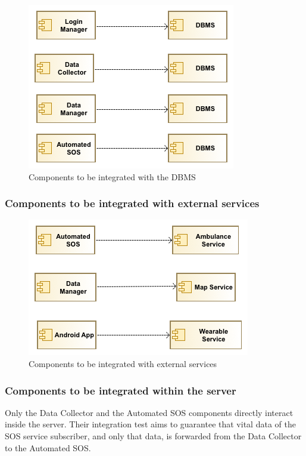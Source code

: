 \begin{figure}[H]
\centering
\includegraphics[scale=0.7]{resources/uml/integration/dbms}
\caption{Components to be integrated with the DBMS}
\end{figure}


\subsubsection{Components to be integrated with external services}


\begin{figure}[H]
\centering
\includegraphics[scale=0.7]{resources/uml/integration/external}
\caption{Components to be integrated with external services}
\end{figure}



\subsubsection{Components to be integrated within the server}
Only the Data Collector and the Automated SOS components directly interact inside the server.
Their integration test aims to guarantee that vital data of the SOS service subscriber, and only that data, is forwarded from the Data Collector to the Automated SOS.

